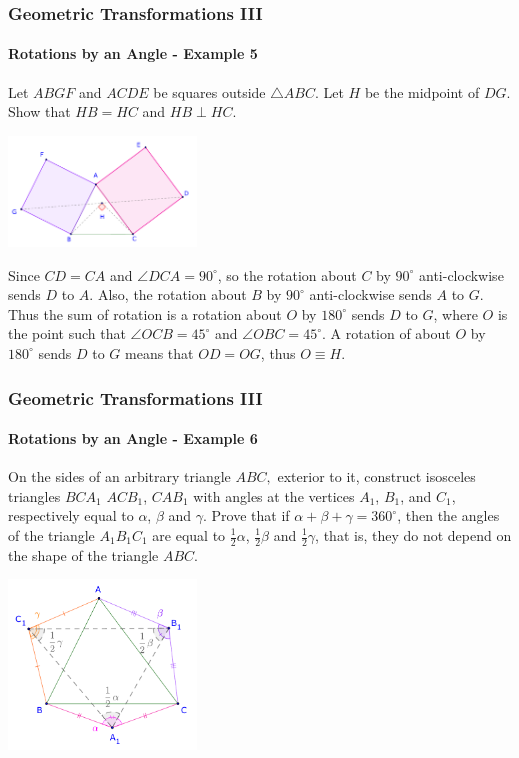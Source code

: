 \documentclass[8pt,xcolor=table,dvipsnames]{beamer}
\providecommand{\half}{\frac{1}{2}}
\newcommand{\dg}{^\circ}
\begin{document}
\begin{frame}[t]
    \frametitle{Geometric Transformations III}
    \framesubtitle{Rotations by an Angle - Example 5}
    \begin{example}
        Let $ABGF$ and $ACDE$ be squares outside $\triangle ABC.$ Let $H$ be the midpoint of $DG$. 
        Show that $HB = HC$ and $HB \perp HC.$
    \end{example}

    \begin{center}
        \includegraphics[width=5cm]{./svg/pdf/rotation-10.pdf}
    \end{center}
    Since $CD = CA$ and $\angle DCA = 90\dg$, so the rotation about $C$ by $90\dg$ anti-clockwise sends $D$ to $A$.
    Also, the rotation about $B$ by $90\dg$ anti-clockwise sends $A$ to $G$.
    \bigbreak
    Thus the sum of rotation is a rotation about $O$ by $180\dg$ sends $D$ to $G$, where
    $O$ is the point such that $\angle OCB = 45\dg$ and $\angle OBC = 45\dg.$
    \bigbreak
    A rotation of about $O$ by $180\dg$ sends $D$ to $G$ means that $OD = OG$, thus $O \equiv H.$
\end{frame}

\begin{frame}[t]
    \frametitle{Geometric Transformations III}
    \framesubtitle{Rotations by an Angle - Example 6}
    \begin{example}
        On the sides of an arbitrary triangle $ABC,$ exterior to it, construct isosceles triangles $BCA_1$ $ACB_1$, $CAB_1$
        with angles at the vertices $A_1$, $B_1$, and $C_1$, respectively equal to $\alpha$, $\beta$ and $\gamma$.
        \bigbreak
        Prove that if $\alpha + \beta + \gamma = 360\dg$, then the angles of the triangle $A_1B_1C_1$
        are equal to $\half\alpha$, $\half\beta$ and $\half\gamma$, that is, they do not depend on the shape of the triangle $ABC.$
    \end{example}

    \begin{center}
        \includegraphics[width=5cm]{./svg/pdf/rotation-6a.pdf}
    \end{center}
\end{frame}
\end{document}
